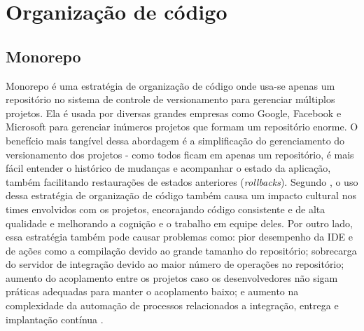\section{Organização de código}

\subsection{Monorepo}
Monorepo é uma estratégia de organização de código onde usa-se apenas um repositório no sistema de controle de versionamento para gerenciar múltiplos projetos. Ela é usada por diversas grandes empresas como Google, Facebook e Microsoft para gerenciar inúmeros projetos que formam um repositório enorme. O benefício mais tangível dessa abordagem é a simplificação do gerenciamento do versionamento dos projetos - como todos ficam em apenas um repositório, é mais fácil entender o histórico de mudanças e acompanhar o estado da aplicação, também facilitando restaurações de estados anteriores (\emph{rollbacks}). Segundo , o uso dessa estratégia de organização de código também causa um impacto cultural nos times envolvidos com os projetos, encorajando código consistente e de alta qualidade e melhorando a cognição e o trabalho em equipe deles. Por outro lado, essa estratégia também pode causar problemas como: pior desempenho da IDE e de ações como a compilação devido ao grande tamanho do repositório; sobrecarga do servidor de integração devido ao maior número de operações no repositório; aumento do acoplamento entre os projetos caso os desenvolvedores não sigam práticas adequadas para manter o acoplamento baixo; e aumento na complexidade da automação de processos relacionados a integração, entrega e implantação contínua \cite{monorepo-polirepo-semaphoreci, monorepo-do-or-do-not, monorepo-polirepo-nicolas}.





